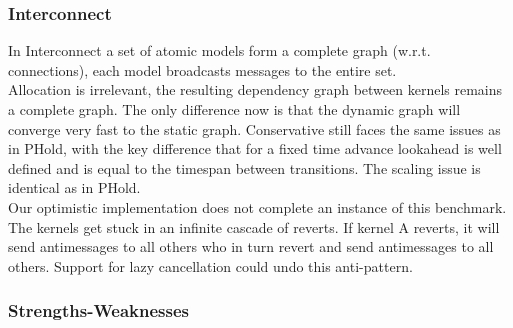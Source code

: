 \subsubsection{Interconnect}
In Interconnect %
a set of atomic models form a complete graph (w.r.t. connections), each model broadcasts messages to the entire set. \\
Allocation is irrelevant, the resulting dependency graph between kernels remains  a complete graph. The only difference now is that the dynamic graph will converge very fast to the static graph. %
Conservative still faces the same issues as in PHold, with the key difference that for a fixed time advance lookahead is well defined and is equal to the timespan between transitions. The scaling issue is identical as in PHold.\\
Our optimistic implementation does not complete an instance of this benchmark. The kernels get stuck in an infinite cascade of reverts. If kernel A reverts, it will send antimessages to all others who in turn revert and send antimessages to all others. Support for lazy cancellation could undo this anti-pattern.
\subsubsection{Strengths-Weaknesses} %
